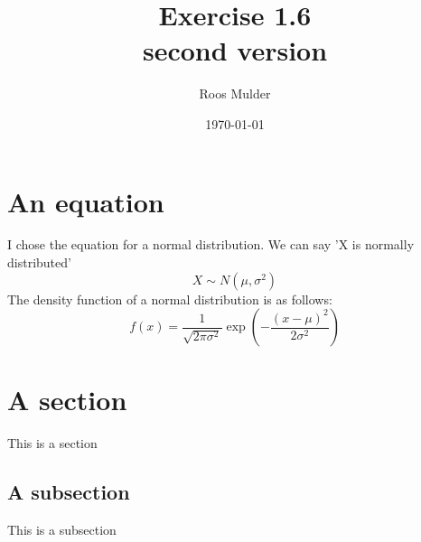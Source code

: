\documentclass[10pt, a4paper, titlepage]{article}
\title{Exercise 1.6\\ \small second version}
\author{Roos Mulder}
\date{\today}
\begin{document}
\maketitle
\newpage

\section*{An equation}
I chose the equation for a normal distribution. We can say 'X is normally distributed' 
\[
X \sim N(\mu, \sigma^2)
\]
The density function of a normal distribution is as follows:
\[
f(x) = \frac{1}{\sqrt{2\pi\sigma^2}}
       \exp\left(-\frac{(x-\mu)^2}{2\sigma^2}\right)
\]


\section*{A section}
This is a section

\subsection*{A subsection}
This is a subsection
\end{document}
